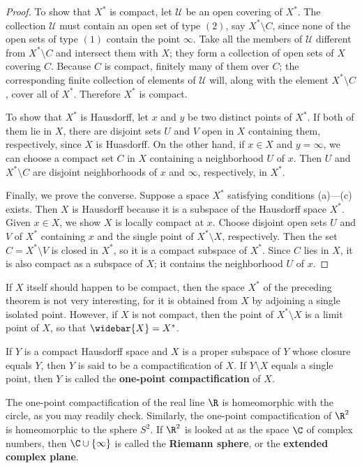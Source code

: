 \begin{proof}
To show that $X^*$ is compact, let $\mathcal{U}$ be an open covering of $X^*$. The collection $\mathcal{U}$ must contain an open set of type $(2)$, say $X^*\setminus C$, since none of the open sets of type $(1)$ contain the point $\infty$. Take all the members of $\mathcal{U}$ different from $X^*\setminus C$ and intersect them with $X$; they form a collection of open sets of $X$ covering $C$. Because $C$ is compact, finitely many of them  over $C$; the corresponding finite collection of elements of $\mathcal{U}$ will, along with the element $X^*\setminus C$, cover all of $X^*$. Therefore $X^*$ is compact.\par
To show that $X^*$ is Hausdorff, let $x$ and $y$ be two distinct points of $X^*$. If both of them lie in $X$, there are disjoint sets $U$ and $V$ open in $X$ containing them, respectively, since $X$ is Huasdorff. On the other hand, if $x\in X$ and $y=\infty$, we can choose a compact set $C$ in $X$ containing a neighborhood $U$ of $x$. Then $U$ and $X^*\setminus C$ are disjoint neighborhoods of $x$ and $\infty$, respectively, in $X^*$.\par
Finally, we prove the converse. Suppose a space $X^*$ satisfying conditions (a)---(c) exists. Then $X$ is Hausdorff because it is a subspace of the Hausdorff space $X^*$. Given $x\in X$, we show $X$ is locally compact at $x$. Choose disjoint open sets $U$ and $V$ of $X^*$ containing $x$ and the single point of $X^*\setminus X$, respectively. Then the set $C=X^*\setminus V$ is closed in $X^*$, so it is a compact subspace of $X^*$. Since $C$ lies in $X$, it is also compact as a subspace of $X$; it contains the neighborhood $U$ of $x$.
\end{proof}
If $X$ itself should happen to be compact, then the space $X^*$ of the preceding theorem is not very interesting, for it is obtained from $X$ by adjoining a single isolated point. However, if $X$ is not compact, then the point of $X^*\setminus X$ is a limit point of $X$, so that $\widebar{X}=X^*$.
\begin{definition}
If $Y$ is a compact Hausdorff space and $X$ is a proper subspace of $Y$ whose closure equals $Y$, then $Y$ is said to be a compactification of $X$. If $Y\setminus X$ equals a single point, then $Y$ is called the \textbf{one-point compactification} of $X$.
\end{definition}
\begin{example}
The one-point compactification of the real line $\R$ is homeomorphic with
the circle, as you may readily check. Similarly, the one-point compactification of $\R^2$ is homeomorphic to the sphere $S^2$. If $\R^2$ is looked at as the space $\C$ of complex numbers, then $\C\cup\{\infty\}$ is called the \textbf{Riemann sphere}, or the \textbf{extended complex plane}.
\end{example}
